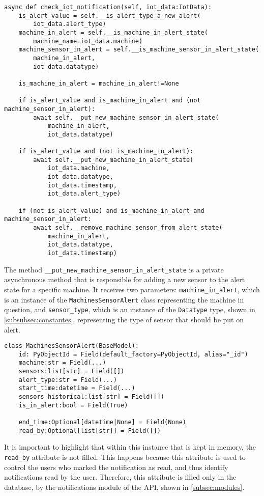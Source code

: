 \begin{verbatim}
async def check_iot_notification(self, iot_data:IotData):
    is_alert_value = self.__is_alert_type_a_new_alert(
        iot_data.alert_type)
    machine_in_alert = self.__is_machine_in_alert_state(
        machine_name=iot_data.machine)
    machine_sensor_in_alert = self.__is_machine_sensor_in_alert_state(
        machine_in_alert,
        iot_data.datatype)

    is_machine_in_alert = machine_in_alert!=None

    if is_alert_value and is_machine_in_alert and (not machine_sensor_in_alert):
        await self.__put_new_machine_sensor_in_alert_state(
            machine_in_alert,
            iot_data.datatype)

    if is_alert_value and (not is_machine_in_alert):
        await self.__put_new_machine_in_alert_state(
            iot_data.machine,
            iot_data.datatype,
            iot_data.timestamp,
            iot_data.alert_type)

    if (not is_alert_value) and is_machine_in_alert and machine_sensor_in_alert:
        await self.__remove_machine_sensor_from_alert_state(
            machine_in_alert,
            iot_data.datatype,
            iot_data.timestamp)
\end{verbatim}

The method \texttt{\_\_put\_new\_machine\_sensor\_in\_alert\_state} is a private asynchronous method that is responsible for adding a new sensor to the alert state for a specific machine. It receives two parameters: \texttt{machine\_in\_alert}, which is an instance of the \texttt{MachinesSensorAlert} class representing the machine in question, and \texttt{sensor\_type}, which is an instance of the \texttt{Datatype} type, shown in \ref{subsubsec:constantes}, representing the type of sensor that should be put on alert.

\begin{verbatim}
class MachinesSensorAlert(BaseModel):
    id: PyObjectId = Field(default_factory=PyObjectId, alias="_id")
    machine:str = Field(...)
    sensors:list[str] = Field([])
    alert_type:str = Field(...)
    start_time:datetime = Field(...)
    sensors_historical:list[str] = Field([])
    is_in_alert:bool = Field(True)
    
    end_time:Optional[datetime|None] = Field(None)
    read_by:Optional[list[str]] = Field([])
\end{verbatim}

It is important to highlight that within this instance that is kept in memory, the \texttt{read\_by} attribute is not filled. This happens because this attribute is used to control the users who marked the notification as read, and thus identify notifications read by the user. Therefore, this attribute is filled only in the database, by the notifications module of the \gls{API}, shown in \ref{subsec:modules}.

